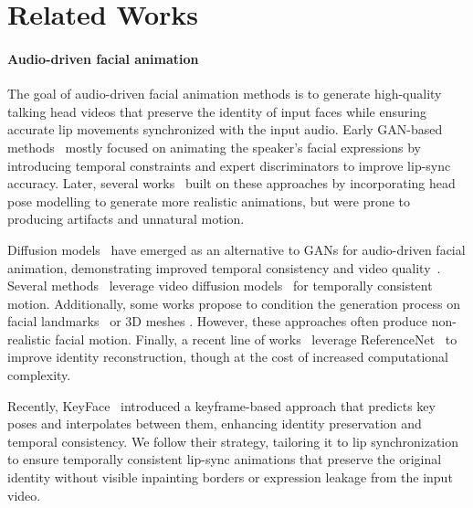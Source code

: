 \section{Related Works}
\label{sec:formatting}

\paragraph{Audio-driven facial animation}
The goal of audio-driven facial animation methods is to generate high-quality talking head videos that preserve the identity of input faces while ensuring accurate lip movements synchronized with the input audio. Early GAN-based methods~\cite{DBLP:conf/bmvc/VougioukasPP18,Vougioukas, zhou2019talking, chung2017you} mostly focused on animating the speaker's facial expressions by introducing temporal constraints and expert discriminators to improve lip-sync accuracy. Later, several works~\cite{chen2020talking, zhang2022sadtalker, zhou2021pose} built on these approaches by incorporating head pose modelling to generate more realistic animations, but were prone to producing artifacts and unnatural motion.

Diffusion models~\cite{ho2020ddpm, rombach2022highresolutionimagesynthesislatent} have emerged as an alternative to GANs for audio-driven facial animation, demonstrating improved temporal consistency and video quality~\cite{du2023dae, xu2024vasa}. Several methods~\cite{stypulkowski2023, xu2024hallohierarchicalaudiodrivenvisual, wang2024V-Express, chen2024echomimiclifelikeaudiodrivenportrait} leverage video diffusion models~\cite{ho2022video, blattmann2023stablevideodiffusionscaling} for temporally consistent motion. Additionally, some works propose to condition the generation process on facial landmarks~\cite{wei2024aniportraitaudiodrivensynthesisphotorealistic} or 3D meshes \cite{zhang2023dream}. However, these approaches often produce non-realistic facial motion. Finally, a recent line of works~\cite{wei2024aniportraitaudiodrivensynthesisphotorealistic, wang2024V-Express, chen2024echomimiclifelikeaudiodrivenportrait} leverage ReferenceNet~\cite{animateanyone} to improve identity reconstruction, though at the cost of increased computational complexity. 

Recently, KeyFace~\cite{keyface} introduced a keyframe-based approach that predicts key poses and interpolates between them, enhancing identity preservation and temporal consistency. We follow their strategy, tailoring it to lip synchronization to ensure temporally consistent lip-sync animations that preserve the original identity without visible inpainting borders or expression leakage from the input video.

